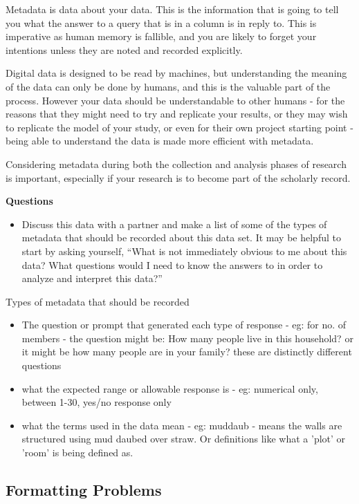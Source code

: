 \documentclass{article}
\begin{document}
Metadata is data about your data. This is the information that is going to tell you what the answer to a query that is in a column is in reply to. This is imperative as human memory is fallible, and you are likely to forget your intentions unless they are noted and recorded explicitly. 

Digital data is designed to be read by machines, but understanding the meaning of the data can only be done by humans, and this is the valuable part of the process. However your data should be understandable to other humans - for the reasons that they might need to try and replicate your results, or they may wish to replicate the model of your study, or even for their own project starting point - being able to understand the data is made more efficient with metadata. 

Considering metadata during both the collection and analysis phases of research is important, especially if your research is to become part of the scholarly record. 

\noindent \textbf{Questions}
\begin{itemize}
    \item Discuss this data with a partner and make a list of some of the types of metadata that should be recorded about this data set. It may be helpful to start by asking yourself, ``What is not immediately obvious to me about this data? What questions would I need to know the answers to in order to analyze and interpret this data?''
\end{itemize}

Types of metadata that should be recorded
\begin{itemize}
    \item The question or prompt that generated each type of response - eg: for no. of members - the question might be: How many people live in this household? or it might be how many people are in your family? these are distinctly different questions
    \item what the expected range or allowable response is - eg: numerical only, between 1-30, yes/no response only
    \item what the terms used in the data mean - eg: muddaub - means the walls are structured using mud daubed over straw. Or definitions like what a 'plot' or 'room' is being defined as. 
\end{itemize}

\subsection{Formatting Problems}
\end{document}
